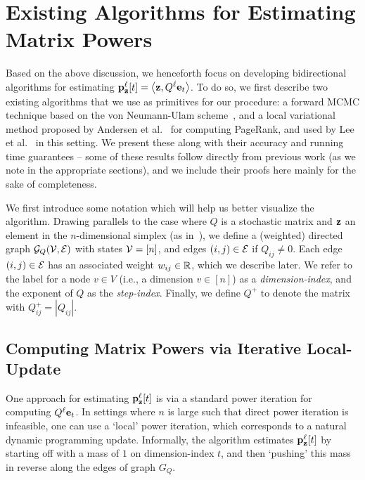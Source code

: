 \section{Existing Algorithms for Estimating Matrix Powers}
\label{sec:existing}

Based on the above discussion, we henceforth focus on developing bidirectional algorithms for estimating ${\mathbf{p}}_\mathbf{z}^{\ell}[t] =\left< \mathbf{z}, Q^{\ell}\mathbf{e}_t \right>$.
To do so, we first describe two existing algorithms that we use as primitives for our procedure: a forward MCMC technique based on the von Neumann-Ulam scheme~\cite{Wasow1952,ji2013convergence}, and a local variational method proposed by Andersen et al.~\cite{andersen2007local} for computing PageRank, and used by Lee et al.~\cite{lee2014asynchronous} in this setting. 
We present these along with their accuracy and running time guarantees -- some of these results follow directly from previous work (as we note in the appropriate sections), and we include their proofs here mainly for the sake of completeness.

We first introduce some notation which will help us better visualize the algorithm.
Drawing parallels to the case where $Q$ is a stochastic matrix and $\mathbf{z}$ an element in the $n$-dimensional simplex (as in~\cite{banerjee2015fast}), we define a (weighted) directed graph ${\mathcal{G}}_Q({\mathcal{V}},{\mathcal{E}})$ with states ${\mathcal{V}} = [n]$, and edges $(i,j)\in {\mathcal{E}}$ if $Q_{ij}\neq 0$. 
Each edge $(i,j)\in{\mathcal{E}}$ has an associated weight $w_{ij}\in\mathbb{R}$, which we describe later.
We refer to the label for a node $v\in V$ (i.e., a dimension $v\in[n]$) as a \emph{dimension-index}, and the exponent of $Q$ as the \emph{step-index}.
Finally, we define $Q^+$ to denote the matrix with $Q^+_{ij} = |Q_{ij}|$. 


\subsection{Computing Matrix Powers via Iterative Local-Update}
\label{ssec:reverse}

One approach for estimating ${\mathbf{p}}_\mathbf{z}^{\ell}[t]$ is via a standard power iteration for computing $Q^{\ell}\mathbf{e}_t$. 
In settings where $n$ is large such that direct power iteration is infeasible, one can use a `local' power iteration, which corresponds to a natural dynamic programming update. Informally, the algorithm estimates ${\mathbf{p}}_\mathbf{z}^{\ell}[t]$ by starting off with a mass of $1$ on dimension-index $t$, and then `pushing' this mass in reverse along the edges of graph $G_Q$. 

